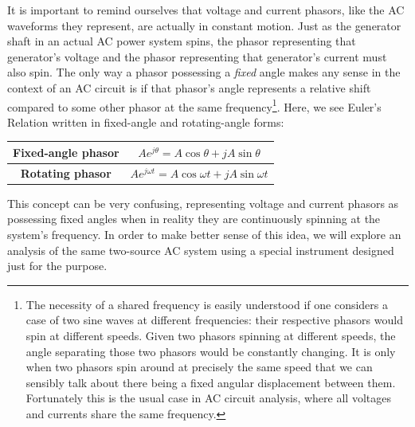 \vskip 10pt

\filbreak

It is important to remind ourselves that voltage and current phasors, like the AC waveforms they represent, are actually in constant motion.  Just as the generator shaft in an actual AC power system spins, the phasor representing that generator's voltage and the phasor representing that generator's current must also spin.  The only way a phasor possessing a \textit{fixed} angle makes any sense in the context of an AC circuit is if that phasor's angle represents a relative shift compared to some other phasor at the same frequency\footnote{The necessity of a shared frequency is easily understood if one considers a case of two sine waves at different frequencies: their respective phasors would spin at different speeds.  Given two phasors spinning at different speeds, the angle separating those two phasors would be constantly changing.  It is only when two phasors spin around at precisely the same speed that we can sensibly talk about there being a fixed angular displacement between them.  Fortunately this is the usual case in AC circuit analysis, where all voltages and currents share the same frequency.}.  Here, we see Euler's Relation written in fixed-angle and rotating-angle forms:

\begin{center}
\begin{tabular}{| c | c |}
\hline 
\textbf{Fixed-angle phasor} & $Ae^{j \theta} = A \cos \theta + j A \sin \theta$  \\[3pt] \hline 
\textbf{Rotating phasor} & $Ae^{j \omega t} = A \cos \omega t + j A \sin \omega t$  \\[3pt] \hline 
\end{tabular}
\end{center}

This concept can be very confusing, representing voltage and current phasors as possessing fixed angles when in reality they are continuously spinning at the system's frequency.  In order to make better sense of this idea, we will explore an analysis of the same two-source AC system using a special instrument designed just for the purpose.

\filbreak

